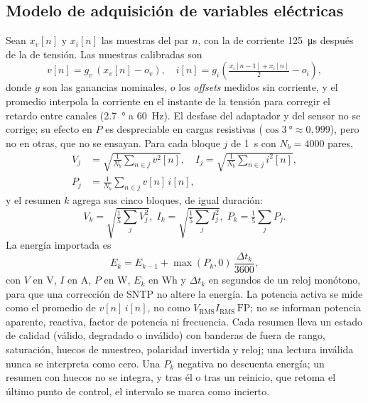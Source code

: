 \subsection{Modelo de adquisición de variables eléctricas}
\label{sec:acquisition}
Sean $x_v[n]$ y $x_i[n]$ las muestras del par $n$, con la de corriente \SI{125}{\micro s} después de la de tensión.
Las muestras calibradas son
\begin{equation}
v[n]=g_v\,(x_v[n]-o_v),\quad i[n]=g_i\left(\tfrac{x_i[n-1]+x_i[n]}{2}-o_i\right),
\label{eq:calib}
\end{equation}
donde $g$ son las ganancias nominales, $o$ los \textit{offsets} medidos sin corriente, y el promedio interpola la corriente en el instante de la tensión para corregir el retardo entre canales (\SI{2,7}{\degree} a \SI{60}{Hz}).
El desfase del adaptador y del sensor no se corrige; su efecto en $P$ es despreciable en cargas resistivas ($\cos\SI{3}{\degree}\approx0{,}999$), pero no en otras, que no se ensayan.
Para cada bloque $j$ de \SI{1}{s} con $N_b=\num{4000}$ pares,
\begin{align}
V_{j}&=\sqrt{\frac{1}{N_b}\sum_{n\in j}v^{2}[n]},\quad
I_{j}=\sqrt{\frac{1}{N_b}\sum_{n\in j}i^{2}[n]},
\label{eq:rms}\\
P_{j}&=\frac{1}{N_b}\sum_{n\in j}v[n]\,i[n],
\label{eq:power}
\end{align}
y el resumen $k$ agrega sus cinco bloques, de igual duración:
\begin{equation}
V_{k}=\sqrt{\tfrac{1}{5}\textstyle\sum_{j}V_{j}^{2}},\;
I_{k}=\sqrt{\tfrac{1}{5}\textstyle\sum_{j}I_{j}^{2}},\;
P_{k}=\tfrac{1}{5}\textstyle\sum_{j}P_{j}.
\label{eq:agg}
\end{equation}
La energía importada es
\begin{equation}
E_{k}=E_{k-1}+\max(P_{k},0)\,\frac{\Delta t_{k}}{3600},
\label{eq:energy}
\end{equation}
con $V$ en V, $I$ en A, $P$ en W, $E_k$ en Wh y $\Delta t_k$ en segundos de un reloj monótono, para que una corrección de SNTP no altere la energía.
La potencia activa se mide como el promedio de $v[n]\,i[n]$, no como $V_{\mathrm{RMS}}I_{\mathrm{RMS}}\,\mathrm{FP}$; no se informan potencia aparente, reactiva, factor de potencia ni frecuencia.
Cada resumen lleva un estado de calidad (válido, degradado o inválido) con banderas de fuera de rango, saturación, huecos de muestreo, polaridad invertida y reloj; una lectura inválida nunca se interpreta como cero.
Una $P_k$ negativa no descuenta energía; un resumen con huecos no se integra, y tras él o tras un reinicio, que retoma el último punto de control, el intervalo se marca como incierto.

